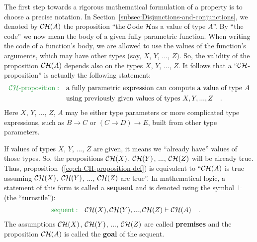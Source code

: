 The first step towards a rigorous mathematical formulation of a property
is to choose a precise notation. In Section~\ref{subsec:Disjunctions-and-conjunctions},
we denoted by ${\cal CH}(A)$ the proposition \textsf{``}the ${\cal C}$ode
${\cal H}$as a value of type $A$\textsf{''}. By \textsf{``}the code\textsf{''} we now mean
the body of a given fully parametric function. When writing the code
of a function\textsf{'}s body, we are allowed to use the values of the function\textsf{'}s
arguments, which may have other types (say, $X$, $Y$, ..., $Z$).
So, the validity of the proposition ${\cal CH}(A)$ depends also on
the types $X$, $Y$, ..., $Z$. It follows that a \textsf{``}${\cal CH}$-proposition\textsf{''}
is actually the following statement:
\begin{align}
{\color{greenunder}{\cal CH}\text{-proposition}:}\quad & \text{a fully parametric expression can compute a value of type }A\nonumber \\
 & \text{using previously given values of types }X,Y,...,Z\quad.\label{eq:ch-CH-proposition-def}
\end{align}
Here $X$, $Y$, ..., $Z$, $A$ may be either type parameters or
more complicated type expressions, such as $B\rightarrow C$ or $(C\rightarrow D)\rightarrow E$,
built from other type parameters.

If values of types $X$, $Y$, ..., $Z$ are given, it means we \textsf{``}already
have\textsf{''} values of those types. So, the propositions ${\cal CH}(X)$,
${\cal CH}(Y)$, ..., ${\cal CH}(Z)$ will be already true. Thus,
proposition~(\ref{eq:ch-CH-proposition-def}) is equivalent to \textsf{``}${\cal CH}(A)$
is true assuming ${\cal CH}(X)$, ${\cal CH}(Y)$, ..., ${\cal CH}(Z)$
are true\textsf{''}. In mathematical logic, a statement of this form is called
a \textbf{sequent} and is denoted using
the symbol $\vdash$ (the \textsf{``}turnstile\textsf{''}):
\begin{align}
{\color{greenunder}\text{sequent}:}\quad & {\cal CH}(X),{\cal CH}(Y),...,{\cal CH}(Z)\vdash{\cal CH}(A)\quad.\label{eq:ch-example-sequent}
\end{align}
The assumptions ${\cal CH}(X)$, ${\cal CH}(Y)$, ..., ${\cal CH}(Z)$
are called \textbf{premises} and
the proposition ${\cal CH}(A)$ is called the \textbf{goal}
of the sequent.

